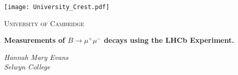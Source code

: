 \begin{titlepage}
  \centering
  \texttt{[image: University\_Crest.pdf]}\par\vspace{1cm}
  {\scshape\LARGE  University of Cambridge \par}
  \vspace{1cm}
  \vspace{1.5cm}
  {\LARGE\bfseries Measurements of $B \to \mu^{+} \mu^{-}$ decays using the LHCb Experiment. \par}
  \vspace{2cm}
  {\Large\itshape Hannah Mary Evans\\
    Selwyn College\par}
  \vfill
  {\large
  }
  \vfill

  {\large }
\end{titlepage}
